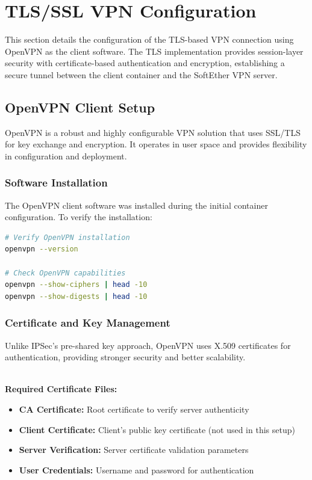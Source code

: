 \newpage

\section{TLS/SSL VPN Configuration}

This section details the configuration of the TLS-based VPN connection using OpenVPN as the client software. The TLS implementation provides session-layer security with certificate-based authentication and encryption, establishing a secure tunnel between the client container and the SoftEther VPN server.

\subsection{OpenVPN Client Setup}

OpenVPN is a robust and highly configurable VPN solution that uses SSL/TLS for key exchange and encryption. It operates in user space and provides flexibility in configuration and deployment.

\subsubsection{Software Installation}

The OpenVPN client software was installed during the initial container configuration. To verify the installation:

\begin{lstlisting}[language=bash]
# Verify OpenVPN installation
openvpn --version

# Check OpenVPN capabilities
openvpn --show-ciphers | head -10
openvpn --show-digests | head -10

\end{lstlisting}

\subsubsection{Certificate and Key Management}

Unlike IPSec's pre-shared key approach, OpenVPN uses X.509 certificates for authentication, providing stronger security and better scalability.

\noindent
\\
\textbf{Required Certificate Files:}

\begin{itemize}
    \item \textbf{CA Certificate:} Root certificate to verify server authenticity
    \item \textbf{Client Certificate:} Client's public key certificate (not used in this setup)
    \item \textbf{Server Verification:} Server certificate validation parameters
    \item \textbf{User Credentials:} Username and password for authentication
\end{itemize}

